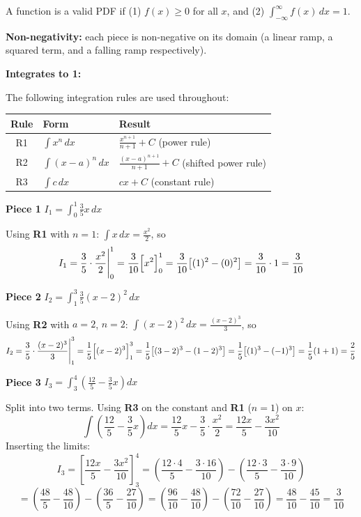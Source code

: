 \documentclass[12pt, a4paper]{article}
\begin{document}
A function is a valid PDF if (1) $f(x) \geq 0$ for all $x$, and
(2) $\int_{-\infty}^{\infty} f(x)\,dx = 1$.

\textbf{Non-negativity:} each piece is non-negative on its domain
(a linear ramp, a squared term, and a falling ramp respectively). \checkmark

\textbf{Integrates to 1:}

The following integration rules are used throughout:

\begin{center}
\renewcommand{\arraystretch}{1.6}
\begin{tabular}{cll}
  \hline
  \textbf{Rule} & \textbf{Form} & \textbf{Result} \\
  \hline
  R1 & $\displaystyle\int x^n\,dx$ & $\displaystyle\frac{x^{n+1}}{n+1} + C$ \quad (power rule) \\
  R2 & $\displaystyle\int (x-a)^n\,dx$ & $\displaystyle\frac{(x-a)^{n+1}}{n+1} + C$ \quad (shifted power rule) \\
  R3 & $\displaystyle\int c\,dx$ & $cx + C$ \quad (constant rule) \\
  \hline
\end{tabular}
\end{center}

\medskip
\textbf{Piece 1} \quad $I_1 = \displaystyle\int_0^1 \frac{3}{5}x\,dx$

Using \textbf{R1} with $n=1$: $\displaystyle\int x\,dx = \frac{x^2}{2}$, so
\[
  I_1 = \frac{3}{5}\cdot\frac{x^2}{2}\Bigg|_0^1
      = \frac{3}{10}\Bigl[x^2\Bigr]_0^1
      = \frac{3}{10}\bigl[(1)^2 - (0)^2\bigr]
      = \frac{3}{10}\cdot 1
      = \frac{3}{10}
\]

\medskip
\textbf{Piece 2} \quad $I_2 = \displaystyle\int_1^3 \frac{3}{5}(x-2)^2\,dx$

Using \textbf{R2} with $a=2$, $n=2$: $\displaystyle\int(x-2)^2\,dx = \frac{(x-2)^3}{3}$, so
\[
  I_2 = \frac{3}{5}\cdot\frac{(x-2)^3}{3}\Bigg|_1^3
      = \frac{1}{5}\Bigl[(x-2)^3\Bigr]_1^3
      = \frac{1}{5}\bigl[(3-2)^3 - (1-2)^3\bigr]
      = \frac{1}{5}\bigl[(1)^3 - (-1)^3\bigr]
      = \frac{1}{5}(1+1)
      = \frac{2}{5}
\]

\medskip
\textbf{Piece 3} \quad $I_3 = \displaystyle\int_3^4 \left(\frac{12}{5} - \frac{3}{5}x\right)dx$

Split into two terms. Using \textbf{R3} on the constant and \textbf{R1} ($n=1$) on $x$:
\[
  \int\left(\frac{12}{5} - \frac{3}{5}x\right)dx
  = \frac{12}{5}x - \frac{3}{5}\cdot\frac{x^2}{2}
  = \frac{12x}{5} - \frac{3x^2}{10}
\]
Inserting the limits:
\[
  I_3 = \left[\frac{12x}{5} - \frac{3x^2}{10}\right]_3^4
      = \left(\frac{12\cdot 4}{5} - \frac{3\cdot 16}{10}\right)
        - \left(\frac{12\cdot 3}{5} - \frac{3\cdot 9}{10}\right)
\]
\[
      = \left(\frac{48}{5} - \frac{48}{10}\right)
        - \left(\frac{36}{5} - \frac{27}{10}\right)
      = \left(\frac{96}{10} - \frac{48}{10}\right)
        - \left(\frac{72}{10} - \frac{27}{10}\right)
      = \frac{48}{10} - \frac{45}{10}
      = \frac{3}{10}
\]
\end{document}
